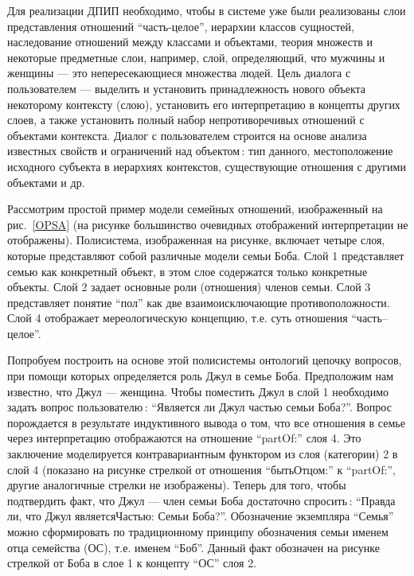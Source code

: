 \documentclass[utf8]{../IncArticle}
\newcommand{\e}[2][fcolor]{\textcolor{pcolor}{[}\textcolor{#1}{#2}\textcolor{pcolor}{]}}
\begin{document}
Для реализации ДПИП необходимо, чтобы в системе уже были реализованы
слои представления отношений ``часть-целое'', иерархии классов
сущностей, наследование отношений между классами и объектами, теория
множеств и некоторые предметные слои, например, слой, определяющий,
что мужчины и женщины --- это непересекающиеся множества людей.  Цель
диалога с пользователем --- выделить и установить принадлежность нового
объекта некоторому контексту (слою), установить его интерпретацию в
концепты других слоев, а также установить полный набор
непротиворечивых отношений с объектами контекста.  Диалог с
пользователем строится на основе анализа известных свойств и
ограничений над объектом\,: тип данного, местоположение исходного
субъекта в иерархиях контекстов, существующие отношения с другими
объектами и др.


Рассмотрим простой пример модели семейных отношений, изображенный на
рис.~\ref{OPSA} (на рисунке большинство очевидных отображений
интерпретации не отображены).  Полисистема, изображенная на рисунке,
включает четыре слоя, которые представляют собой различные модели
семьи Боба.  Слой 1 представляет семью как конкретный объект, в этом
слое содержатся только конкретные объекты.  Слой 2 задает основные
роли (отношения) членов семьи. Слой 3 представляет понятие ``пол'' как
две взаимоисключающие противоположности.  Слой 4 отображает
мереологическую концепцию, т.е. суть отношения ``часть--целое''.

Попробуем построить на основе этой полисистемы онтологий цепочку
вопросов, при помощи которых определяется роль Джул в семье Боба.
Предположим нам известно, что Джул --- женщина.  Чтобы поместить Джул
в слой 1 необходимо задать вопрос пользователю\,: ``Является ли Джул
частью семьи Боба?''.  Вопрос порождается в результате индуктивного
вывода о том, что все отношения в семье через интерпретацию
отображаются на отношение ``partOf:'' слоя 4.  Это заключение
моделируется контравариантным функтором из слоя (категории) 2 в слой 4
(показано на рисунке стрелкой от отношения ``бытьОтцом:'' к
``partOf:'', другие аналогичные стрелки не изображены).  Теперь для
того, чтобы подтвердить факт, что Джул --- член семьи Боба достаточно
спросить\,: ``Правда ли, что Джул являетсяЧастью: Семьи Боба?''.
Обозначение экземпляра ``Семья'' можно сформировать по традиционному
принципу обозначения семьи именем отца семейства (ОС), т.е. именем
``Боб''.  Данный факт обозначен на рисунке стрелкой от Боба в слое 1 к
концепту ``ОС'' слоя 2.
\end{document}
